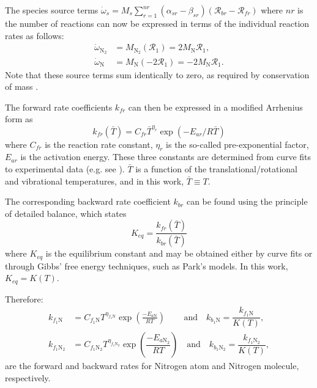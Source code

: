 \documentclass[10pt]{article}
\begin{document}
The species source terms $\dot{\omega}_s = M_s \sum_{r=1}^{nr}\left(\alpha_{sr}-\beta_{sr}\right)\left(\mathcal{R}_{br} - \mathcal{R}_{fr}\right)$ 
 where $nr$ is the number of reactions can now be expressed in terms of the individual reaction rates as follows:
\begin{align*}
 \dot{\omega}_{\text{N}_2} &= M_{\text{N}_2}\left(\mathcal{R}_1\right)= 2 M_\text{N} \mathcal{R}_1 ,\\
 \dot{\omega}_{\text{N}} &= M_{\text{N}}\left(-2\mathcal{R}_1 \right)=-2 M_\text{N} \mathcal{R}_1. 
\end{align*}
Note that these source terms sum identically to zero, as required by conservation of mass \citep{Kessler2004}.



The forward rate coefficients  $k_{fr}$  can then be expressed in a modified Arrhenius form as
\begin{equation}\label{eq:equilibrium_constant}
  k_{fr}\left(\bar{T}\right) = C_{fr} \bar{T}^{\eta_r} \exp \left(-E_{ar}/R\bar{T}\right)
\end{equation}
where $C_{fr}$ is the reaction rate constant, $\eta_r$ is the so-called pre-exponential factor, $E_{ar}$ is the activation energy.  These three constants are determined from curve fits to experimental data (e.g. see \cite{Ait1996}). $\bar{T}$ is a function of the translational/rotational and vibrational temperatures, and in this work, $\bar{T}\equiv T$.

The corresponding backward rate coefficient   $k_{br}$  can be found using the principle of detailed balance, which states
\begin{equation}
  K_{eq} = \frac{k_{fr}\left(\bar{T}\right)}{k_{br}\left(\bar{T}\right)}
\end{equation}
where $K_{eq}$ is the equilibrium constant and may be obtained either by curve fits or through Gibbs' free energy techniques, such as Park's models. In this work, $K_{eq}=K(T)$.


Therefore:
\begin{equation}
 \begin{split}
\label{eq:forward_rates1}
k_{f_1 \text{N}} &= C_{f_1 \text{N}} T^{\eta_{f_1 \text{N}}} \exp\left(\frac{-E_{a\text{N}}}{R T}\right) \qquad \,\mbox{and}\quad k_{b_1 \text{N}} = \dfrac{k_{f_1 \text{N}}}{K(T)},\\
%
k_{f_1 \text{N}_2} &= C_{f_1 \text{N}_2} T^{\eta_{f_1 \text{N}_2}} \exp\left(\dfrac{-E_{a\text{N}_2}}{R T}\right) \quad \mbox{and}\quad k_{b_1 \text{N}_2} = \dfrac{k_{f_1 \text{N}_2}}{K(T)},
%
 \end{split}
\end{equation}
are the forward and backward rates for Nitrogen atom and Nitrogen molecule, respectively.
\end{document}
